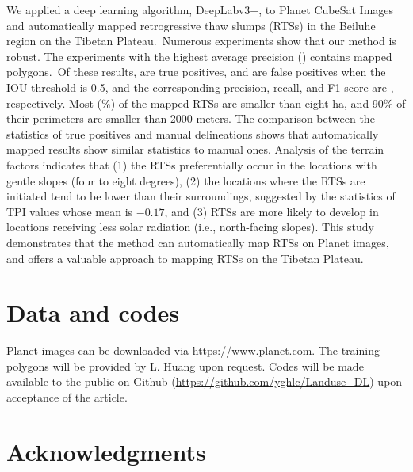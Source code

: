 \documentclass[authoryear,preprint,review,12pt]{elsarticle}
\begin{document}
We applied a deep learning algorithm, DeepLabv3+, to Planet CubeSat Images and automatically mapped retrogressive thaw slumps (RTSs) in the Beiluhe region on the Tibetan Plateau.~Numerous experiments show that our method is robust. The experiments with the highest average precision () contains  mapped polygons.~Of these  results,  are true positives, and  are false positives when the IOU threshold is 0.5, and the corresponding precision, recall, and F1 score are , respectively. Most (\%) of the mapped RTSs are smaller than eight ha, and 90\% of their perimeters are smaller than 2000 meters. The comparison between the statistics of true positives and manual delineations shows that automatically mapped results show similar statistics to manual ones. Analysis of the terrain factors indicates that (1) the RTSs preferentially occur in the locations with gentle slopes (four to eight degrees), (2) the locations where the RTSs are initiated tend to be lower than their surroundings, suggested by the statistics of TPI values whose mean is $-0.17$, and (3) RTSs are more likely to develop in locations receiving less solar radiation (i.e., north-facing slopes). This study demonstrates that the method can automatically map RTSs on Planet images, and offers a valuable approach to mapping RTSs on the Tibetan Plateau.
 

\section{Data and codes}
\label{sec_data_codes}

Planet images can be downloaded via \url{https://www.planet.com}. The training polygons will be provided by L. Huang upon request. 
Codes will be made available to the public on Github (\url{https://github.com/yghlc/Landuse\_DL}) upon acceptance of the article. 


\section{Acknowledgments}
\label{sec_acknowledgments}
\end{document}
